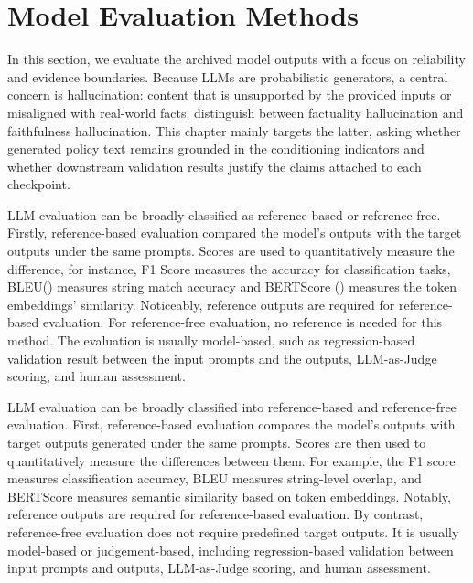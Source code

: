 \section{Model Evaluation Methods}\label{ch2:sec:application}


In this section, we evaluate the archived model outputs with a focus on reliability and evidence boundaries. Because LLMs are probabilistic generators, a central concern is hallucination: content that is unsupported by the provided inputs or misaligned with real-world facts. \citet{huang2025survey} distinguish between factuality hallucination and faithfulness hallucination. This chapter mainly targets the latter, asking whether generated policy text remains grounded in the conditioning indicators and whether downstream validation results justify the claims attached to each checkpoint.




LLM evaluation can be broadly classified as reference-based or reference-free. Firstly, reference-based evaluation compared the model's outputs with the target outputs under the same prompts. Scores are used to quantitatively measure the difference, for instance, F1 Score measures the accuracy for classification tasks, BLEU(\cite{papineni2002bleu}) measures string match accuracy and BERTScore (\cite{zhang2019bertscore}) measures the token embeddings' similarity. Noticeably, reference outputs are required for reference-based evaluation. For reference-free evaluation, no reference is needed for this method. The evaluation is usually model-based, such as regression-based validation result between the input prompts and the outputs, LLM-as-Judge scoring, and human assessment.


LLM evaluation can be broadly classified into reference-based and reference-free evaluation. First, reference-based evaluation compares the model’s outputs with target outputs generated under the same prompts. Scores are then used to quantitatively measure the differences between them. For example, the F1 score measures classification accuracy, BLEU \cite{papineni2002bleu} measures string-level overlap, and BERTScore \cite{zhang2019bertscore} measures semantic similarity based on token embeddings. Notably, reference outputs are required for reference-based evaluation. By contrast, reference-free evaluation does not require predefined target outputs. It is usually model-based or judgement-based, including regression-based validation between input prompts and outputs, LLM-as-Judge scoring, and human assessment.


